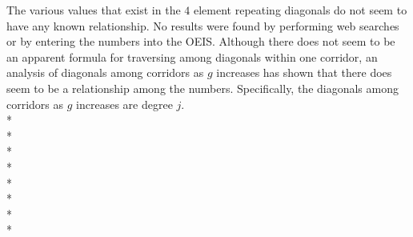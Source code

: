 \documentclass{article}
\newcommand*{\set}[1]{\mathbb{#1}}
\begin{document}
 The various values that exist in the $4$ element repeating diagonals do not seem to have any known relationship. No results were found by performing web searches or by entering the numbers into the OEIS.
 Although there does not seem to be an apparent formula for traversing among diagonals within one corridor, an analysis of diagonals among corridors as $g$ increases has shown that there does seem to be a relationship among the numbers. Specifically, the diagonals among corridors as $g$ increases are degree $j$.\\*\\*\\*\\*\\*\\*\\*\\*
 
 
 
\end{document}
